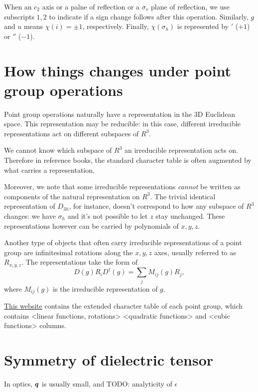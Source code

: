 \documentclass[hyperref, a4paper, 12pt]{article}
\def\texttt#1{<#1>}%
\def\mathbb#1{#1}%
\newcommand{\shortcode}[1]{\texttt{#1}}
\begin{document}
When an $c_2$ axis or a palne of reflection or a $\sigma_v$ plane of reflection,
we use subscripts $1,2$ to indicate if a sign change follows after this operation.
Similarly, $g$ and $u$ means $\chi(i) = \pm 1$, respectively.
Finally, $\chi(\sigma_h)$ is represented by $'$ ($+1$) or $''$ ($-1$).

\section{How things changes under point group operations}\label{sec:how-things-change}

Point group operations naturally have a representation in the 3D Euclidean space.
This representation may be reducible:
in this case, different irreducible representations act on different subspaces of $\mathbb{R}^3$.

We cannot know which subspace of $\mathbb{R}^3$ an irreducible representation acts on.
Therefore in reference books, the standard character table
is often augmented by what carries a representation.

Moreover, we note that some irreducible representations \emph{cannot} be 
written as components of the natural representation on $\mathbb{R}^3$.
The trivial identical representation of $D_{3h}$,
for instance, doesn't correspond to how any subspace of $\mathbb{R}^3$ changes:
we have $\sigma_h$ and it's not possible to let $z$ stay unchanged.
These representations however can be carried by polynomials of $x, y, z$.

Another type of objects that often carry irreducible representations of a point group
are infinitesimal rotations along the $x, y, z$ axes, usually referred to as $R_{x, y, z}$.
The representations take the form of 
\begin{equation}
    D(g) R_i D^\dag(g) = \sum_j M_{ij}(g) R_j,
\end{equation}
where $M_{ij}(g)$ is the irreducible representation of $g$.

\href{http://symmetry.constructor.university/}{This website} 
contains the extended character table of each point group,
which contains \shortcode{linear functions, rotations}
\shortcode{quadratic functions} and \shortcode{cubic functions} columns.

\section{Symmetry of dielectric tensor}

In optics, $\vb*{q}$ is usually small,
and TODO: analyticity of $\epsilon$
\end{document}
